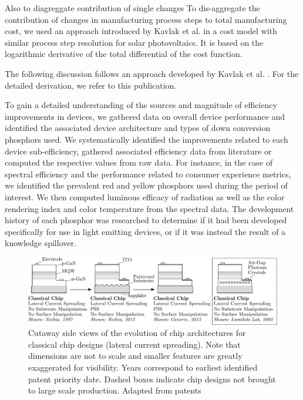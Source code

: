 \documentclass[a4paper,nocompress]{spie}  %
\begin{document}
Also to diagreggate contribution of single changes
To dis-aggregate the contribution of changes in manufacturing process steps to total manufacturing cost, we used an approach introduced by Kavlak et al. in a cost model with similar process step resolution for solar photovoltaics. It is based on the logarithmic derivative of the total differential of the cost function.

The following discussion follows an approach developed by Kavlak et al. \cite{kavlak2018evaluating}. For the detailed derivation, we refer to this publication.

To gain a detailed understanding of the sources and magnitude of efficiency improvements in devices, we gathered data on overall device performance and identified the associated device architecture and types of down conversion phosphors used. We systematically identified the improvements related to each device sub-efficiency, gathered associated efficiency data from literature or computed the respective values from raw data.
For instance, in the case of spectral efficiency and the performance related to consumer experience metrics, we identified the prevalent red and yellow phosphors used during the period of interest. We then computed luminous efficacy of radiation as well as the color rendering index and color temperature from the spectral data. The development history of each phosphor was researched to determine if it had been developed specifically for use in light emitting devices, or if it was instead the result of a knowledge spillover.


\begin{figure} [ht]
    \begin{center}
        \includegraphics[width=\textwidth]{SPIE/article/chip_architectures.pdf}
    \end{center}
    \caption{Cutaway side views of the evolution of chip architectures for classical chip designs (lateral current spreading). Note that dimensions are not to scale and smaller features are greatly exaggerated for visibility. Years correspond to earliest identified patent priority date. Dashed boxes indicate chip designs not brought to large scale production. Adapted from patents \cite{nagahama2013nitride}\cite{tanaka2010semiconductor}\cite{wierer2006photonic}}
    \label{fig:chip_arch}
\end{figure}
\end{document}
